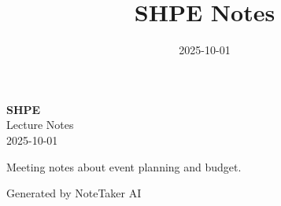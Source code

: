 \documentclass[11pt,a4paper]{article}
\title{\textcolor{primarycolor}{\Huge\textbf{SHPE Notes}}}
\author{}
\date{\textcolor{secondarycolor}{2025-10-01}}
\begin{document}
\begin{center}
    \colorbox{secondarycolor!10}{%
        \parbox{0.95\textwidth}{%
            \centering
            \vspace{0.5cm}
            {\Huge\textcolor{primarycolor}{\textbf{SHPE}}} \\[0.5cm]
            {\Large Lecture Notes} \\[0.3cm]
            {\large\textcolor{secondarycolor}{2025-10-01}}
            \vspace{0.5cm}
        }
    }
\end{center}

\vspace{1cm}

Meeting notes about event planning and budget.

\vspace{1cm}

\begin{center}
\textcolor{secondarycolor}{\small Generated by NoteTaker AI}
\end{center}
\end{document}
